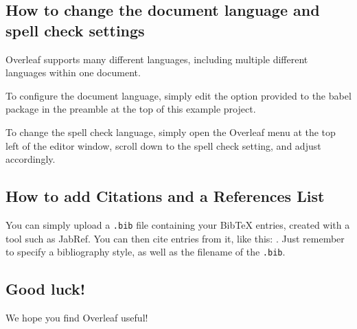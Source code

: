 \documentclass{article}
\begin{document}
\subsection{How to change the document language and spell check settings}

Overleaf supports many different languages, including multiple different languages within one document.

To configure the document language, simply edit the option provided to the babel package in the preamble at the top of this example project.

To change the spell check language, simply open the Overleaf menu at the top left of the editor window, scroll down to the spell check setting, and adjust accordingly.

\subsection{How to add Citations and a References List}

You can simply upload a \verb|.bib| file containing your BibTeX entries, created with a tool such as JabRef. You can then cite entries from it, like this: \cite{greenwade93}. Just remember to specify a bibliography style, as well as the filename of the \verb|.bib|.

\subsection{Good luck!}

We hope you find Overleaf useful!



\end{document}

